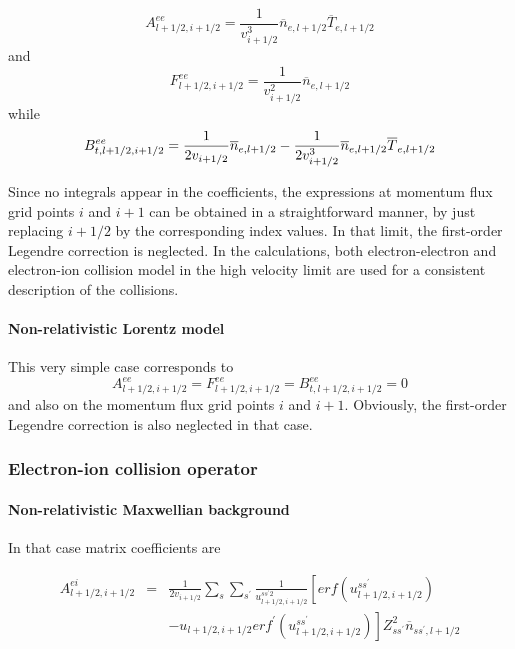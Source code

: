 \begin{equation}
A_{l+1/2,i+1/2}^{ee}=\frac{1}{v_{i+1/2}^{3}}\overline{n}_{e,l+1/2}\overline{T%
}_{e,l+1/2}
\end{equation}
and
\begin{equation}
F_{l+1/2,i+1/2}^{ee}=\frac{1}{v_{i+1/2}^{2}}\overline{n}_{e,l+1/2}
\end{equation}
while
\begin{equation}
B_{t,l+1/2,i+1/2}^{ee}=\frac{1}{2v_{i+1/2}}\overline{n}_{e,l+1/2}-\frac{1}{%
2v_{i+1/2}^{3}}\overline{n}_{e,l+1/2}\overline{T}_{e,l+1/2}
\end{equation}

Since no integrals appear in the coefficients, the expressions at momentum
flux grid points $i$ and $i+1$ can be obtained in a straightforward manner,
by just replacing $i+1/2$ by the corresponding index values. In that limit,
the first-order Legendre correction is neglected. In the calculations, both
electron-electron and electron-ion collision model in the high velocity
limit are used for a consistent description of the collisions.

\paragraph{Non-relativistic Lorentz model}

This very simple case corresponds to
\begin{equation}
A_{l+1/2,i+1/2}^{ee}=F_{l+1/2,i+1/2}^{ee}=B_{t,l+1/2,i+1/2}^{ee}=0
\end{equation}
and also on the momentum flux grid points $i$ and $i+1.$ Obviously, the
first-order Legendre correction is also neglected in that case.

\subsubsection{Electron-ion collision operator}

\paragraph{Non-relativistic Maxwellian background}

In that case matrix coefficients are

\begin{eqnarray}
A_{l+1/2,i+1/2}^{ei} &=&\frac{1}{2v_{i+1/2}}\sum_{s}\sum_{s^{\prime }}\frac{1%
}{u_{l+1/2,i+1/2}^{ss^{\prime }2}}\left[ erf \left(
u_{l+1/2,i+1/2}^{ss^{\prime }}\right) \right.  \nonumber \\
&&\left. -u_{l+1/2,i+1/2}erf ^{\prime }\left( u_{l+1/2,i+1/2}^{ss^{\prime
}}\right) \right] Z_{ss^{\prime }}^{2}\overline{n}_{ss^{\prime },l+1/2}
\end{eqnarray}

